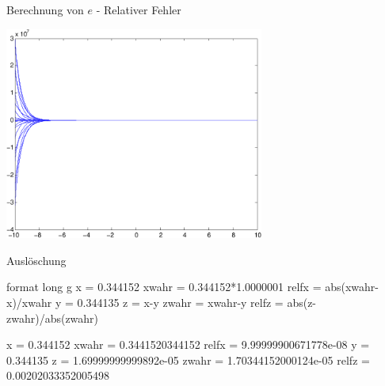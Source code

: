 \documentclass[hyperref={xetex}]{beamer}
\begin{document}
\begin{frame}[fragile]{Berechnung von $e$ - Relativer Fehler}
\begin{center}
\includegraphics[height=7cm]{figures/calcexp}
\end{center}
\end{frame}

\begin{frame}[fragile]{Auslöschung}
\begin{matlabin}
format long g %
x = 0.344152
xwahr = 0.344152*1.0000001 %
relfx = abs(xwahr-x)/xwahr
y = 0.344135
z = x-y
zwahr = xwahr-y
relfz = abs(z-zwahr)/abs(zwahr) %
\end{matlabin}
\begin{matlab}
x = 0.344152
xwahr = 0.3441520344152
relfx = 9.99999900671778e-08
y = 0.344135
z = 1.69999999999892e-05
zwahr = 1.70344152000124e-05
relfz = 0.00202033352005498
\end{matlab}

\end{frame}
\end{document}
